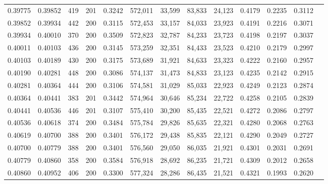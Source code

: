 \begin{tabular}{rrrrrrrrrrrrr}
0.39775 & 0.39852 &   419 & 201 &                                     0.3242 & 572,011 &  33,599 &  83,833 &  24,123 & 0.4179 & 0.2235 & 0.3112 \\
0.39852 & 0.39934 &   442 & 200 &                                     0.3115 & 572,453 &  33,157 &  84,033 &  23,923 & 0.4191 & 0.2216 & 0.3071 \\
0.39934 & 0.40010 &   370 & 200 &                                     0.3509 & 572,823 &  32,787 &  84,233 &  23,723 & 0.4198 & 0.2197 & 0.3037 \\
0.40011 & 0.40103 &   436 & 200 &                                     0.3145 & 573,259 &  32,351 &  84,433 &  23,523 & 0.4210 & 0.2179 & 0.2997 \\
0.40103 & 0.40189 &   430 & 200 &                                     0.3175 & 573,689 &  31,921 &  84,633 &  23,323 & 0.4222 & 0.2160 & 0.2957 \\
0.40190 & 0.40281 &   448 & 200 &                                     0.3086 & 574,137 &  31,473 &  84,833 &  23,123 & 0.4235 & 0.2142 & 0.2915 \\
0.40281 & 0.40364 &   444 & 200 &                                     0.3106 & 574,581 &  31,029 &  85,033 &  22,923 & 0.4249 & 0.2123 & 0.2874 \\
0.40364 & 0.40441 &   383 & 201 &                                     0.3442 & 574,964 &  30,646 &  85,234 &  22,722 & 0.4258 & 0.2105 & 0.2839 \\
0.40441 & 0.40536 &   446 & 201 &                                     0.3107 & 575,410 &  30,200 &  85,435 &  22,521 & 0.4272 & 0.2086 & 0.2797 \\
0.40536 & 0.40618 &   374 & 200 &                                     0.3484 & 575,784 &  29,826 &  85,635 &  22,321 & 0.4280 & 0.2068 & 0.2763 \\
0.40619 & 0.40700 &   388 & 200 &                                     0.3401 & 576,172 &  29,438 &  85,835 &  22,121 & 0.4290 & 0.2049 & 0.2727 \\
0.40700 & 0.40779 &   388 & 200 &                                     0.3401 & 576,560 &  29,050 &  86,035 &  21,921 & 0.4301 & 0.2031 & 0.2691 \\
0.40779 & 0.40860 &   358 & 200 &                                     0.3584 & 576,918 &  28,692 &  86,235 &  21,721 & 0.4309 & 0.2012 & 0.2658 \\
0.40860 & 0.40952 &   406 & 200 &                                     0.3300 & 577,324 &  28,286 &  86,435 &  21,521 & 0.4321 & 0.1993 & 0.2620 \\

\end{tabular}
